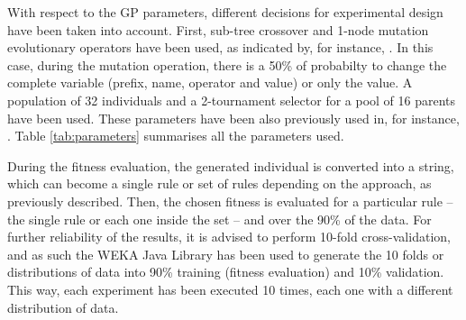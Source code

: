 \documentclass[runningheads]{llncs}
\begin{document}
With respect to the GP parameters, different decisions for experimental design have been taken into account. 
First, sub-tree crossover and 1-node mutation evolutionary operators have
been used, as indicated by, for instance, \cite{EvoStar2014:GPBot}. In this case, during the
mutation operation, there is a 50\% of probabilty to change the complete variable (prefix, name, operator and value) or only the value. A population of 32 individuals and a 2-tournament selector for a pool of
16 parents have been used. These parameters have been also previously
used in, for instance, \cite{EvoStar2014:GPBot}. Table \ref{tab:parameters} summarises all the parameters used.
%
\begin{table}
\begin{center}
\caption{Parameters used in the experiments.}
\label{tab:parameters}
\end{center}
\end{table}

During the fitness evaluation, the generated individual is converted
into a string, which can become a single rule or set of rules
depending on the approach, as previously described. %
Then, the chosen fitness is evaluated for a particular rule -- the single rule or each one inside the set -- and over the 90\% of the data.
For further reliability of the results, it is advised to perform
10-fold cross-validation, and as such the WEKA %
Java Library \cite{HallWEKA09} has been used to generate the 10 folds
or distributions of data into 90\% training (fitness evaluation) and
10\% validation. This way, each experiment has been executed 10 times,
each one with a different distribution of data.
\end{document}
